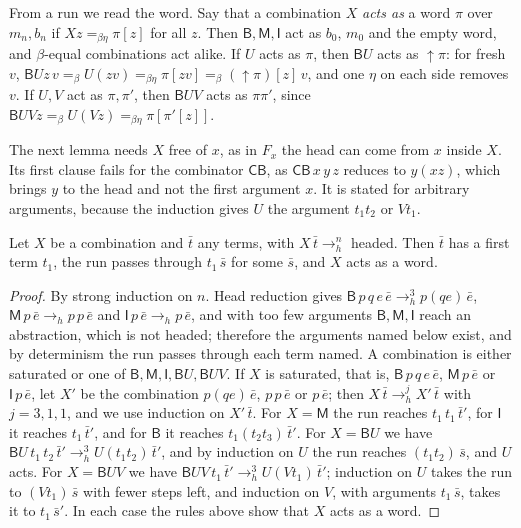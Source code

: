 \documentclass[a4paper,english]{lipics-v2021}
\newcommand{\B}{\mathsf{B}}
\newcommand{\M}{\mathsf{M}}
\newcommand{\I}{\mathsf{I}}
\newcommand{\Cc}{\mathsf{C}}
\newcommand{\hred}{\to_{h}}
\newcommand{\eqb}{=_{\beta}}
\newcommand{\eqbe}{=_{\beta\eta}}
\newcommand{\up}{{\uparrow}}
\begin{document}
From a run we read the word. Say that a combination $X$ \emph{acts as} a word $\pi$ over $m_n,b_n$ if $Xz \eqbe \pi[z]$ for all $z$. Then $\B,\M,\I$ act as $b_0$, $m_0$ and the empty word, and $\beta$-equal combinations act alike. If $U$ acts as $\pi$, then $\B U$ acts as $\up \pi$: for fresh $v$, $\B Uz\,v \eqb U(zv) \eqbe \pi[zv] \eqb (\up \pi)[z]\,v$, and one $\eta$ on each side removes $v$. If $U,V$ act as $\pi,\pi'$, then $\B UV$ acts as $\pi\pi'$, since $\B UVz \eqb U(Vz) \eqbe \pi[\pi'[z]]$.

The next lemma needs $X$ free of $x$, as in $F_x$ the head can come from $x$ inside $X$. Its first clause fails for the combinator $\Cc\B$, as $\Cc\B\,x\,y\,z$ reduces to $y(xz)$, which brings $y$ to the head and not the first argument $x$. It is stated for arbitrary arguments, because the induction gives $U$ the argument $t_1t_2$ or $Vt_1$.

\begin{lemma}\label{lem:first}
Let $X$ be a combination and $\bar t$ any terms, with $X\,\bar t \hred^n$ headed. Then $\bar t$ has a first term $t_1$, the run passes through $t_1\,\bar s$ for some $\bar s$, and $X$ acts as a word.
\end{lemma}

\begin{proof}
By strong induction on $n$. Head reduction gives $\B\,p\,q\,e\,\bar e \hred^3 p(qe)\,\bar e$, $\M\,p\,\bar e \hred p\,p\,\bar e$ and $\I\,p\,\bar e \hred p\,\bar e$, and with too few arguments $\B,\M,\I$ reach an abstraction, which is not headed; therefore the arguments named below exist, and by determinism the run passes through each term named. A combination is either saturated or one of $\B,\M,\I,\B U,\B UV$. If $X$ is saturated, that is, $\B\,p\,q\,e\,\bar e$, $\M\,p\,\bar e$ or $\I\,p\,\bar e$, let $X'$ be the combination $p(qe)\,\bar e$, $p\,p\,\bar e$ or $p\,\bar e$; then $X\,\bar t \hred^j X'\,\bar t$ with $j = 3,1,1$, and we use induction on $X'\,\bar t$. For $X = \M$ the run reaches $t_1\,t_1\,\bar t'$, for $\I$ it reaches $t_1\,\bar t'$, and for $\B$ it reaches $t_1(t_2t_3)\,\bar t'$. For $X = \B U$ we have $\B U\,t_1\,t_2\,\bar t' \hred^3 U(t_1t_2)\,\bar t'$, and by induction on $U$ the run reaches $(t_1t_2)\,\bar s$, and $U$ acts. For $X = \B UV$ we have $\B UV\,t_1\,\bar t' \hred^3 U(Vt_1)\,\bar t'$; induction on $U$ takes the run to $(Vt_1)\,\bar s$ with fewer steps left, and induction on $V$, with arguments $t_1\,\bar s$, takes it to $t_1\,\bar s'$. In each case the rules above show that $X$ acts as a word.
\end{proof}
\end{document}

